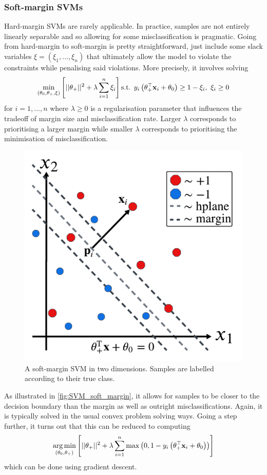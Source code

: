\documentclass[11pt]{article}
\begin{document}
\subsubsection{Soft-margin SVMs}

Hard-margin SVMs are rarely applicable. In practice, samples are not entirely linearly separable and so allowing for some misclassification is pragmatic. Going from hard-margin to soft-margin is pretty straightforward, just include some slack variables $\xi=(\xi_1,\dots,\xi_n)$ that ultimately allow the model to violate the constraints while penalising said violations. More precisely, it involves solving
$$
\min_{(\theta_0,\theta_+,\xi)}\left[||\theta_+||^2+\lambda\sum_{i=1}^n\xi_i\right]\text{s.t. } y_i\left(\theta_+^\top \mathbf{x}_i+\theta_0\right)\geq 1-\xi_i,\text{ }\xi_i\geq0
$$
for $i=1,\dots,n$ where $\lambda\geq0$ is a regularisation parameter that influences the tradeoff of margin size and misclassification rate. Larger $\lambda$ corresponds to prioritising a larger margin while smaller $\lambda$ corresponds to prioritising the minimisation of misclassification.

\begin{figure}[t]
    \centering
    \includegraphics[width=0.75\columnwidth]{./figures/supervised_learning/SVM_soft_margin.pdf}
    \caption{A soft-margin SVM in two dimensions. Samples are labelled according to their true class.}
    \label{fig:SVM_soft_margin}
\end{figure}

As illustrated in \autoref{fig:SVM_soft_margin}, it allows for samples to be closer to the decision boundary than the margin as well as outright misclassifications. Again, it is typically solved in the usual convex problem solving ways. Going a step further, it turns out that this can be reduced to computing
$$
\operatorname*{arg\,min}_{(\theta_0,\theta_+)}\left[||\theta_+||^2+\lambda\sum_{i=1}^n\max\left(0,1-y_i\left(\theta_+^\top \mathbf{x}_i+\theta_0\right)\right)\right]
$$
which can be done using gradient descent.
\end{document}
